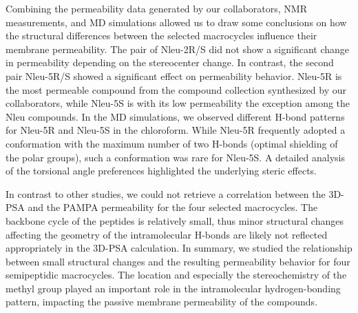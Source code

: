 Combining the permeability data generated by our collaborators, NMR measurements, and MD simulations allowed us to draw some conclusions on how the structural differences between the selected macrocycles influence their membrane permeability. 
The pair of Nleu-2R/S did not show a significant change in permeability depending on the stereocenter change. In contrast, the second pair Nleu-5R/S showed a significant effect on permeability behavior. Nleu-5R is the most permeable compound from the compound collection synthesized by our collaborators, while Nleu-5S is with its low permeability the exception among the Nleu compounds. 
In the MD simulations, we observed different H-bond patterns for Nleu-5R and Nleu-5S in the chloroform. While Nleu-5R frequently adopted a conformation with the maximum number of two H-bonds (optimal shielding of the polar groups), such a conformation was rare for Nleu-5S. A detailed analysis of the torsional angle preferences highlighted the underlying steric effects.

In contrast to other studies, we could not retrieve a correlation between the 3D-PSA and the PAMPA permeability for the four selected macrocycles. The backbone cycle of the peptides is relatively small, thus minor structural changes affecting the geometry of the intramolecular H-bonds are likely not reflected appropriately in the 3D-PSA calculation.
In summary, we studied the relationship between small structural changes and the resulting permeability behavior for four semipeptidic macrocycles. The location and especially the stereochemistry of the methyl group played an important role in the intramolecular hydrogen-bonding pattern, impacting the passive membrane permeability of the compounds.
